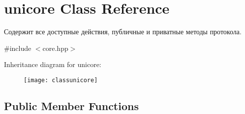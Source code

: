 \hypertarget{classunicore}{}\section{unicore Class Reference}
\label{classunicore}


Содержит все доступные действия, публичные и приватные методы протокола.  




{\ttfamily \#include $<$core.\+hpp$>$}

Inheritance diagram for unicore\+:\begin{figure}[H]
\begin{center}
\leavevmode
\texttt{[image: classunicore]}
\end{center}
\end{figure}
\subsection*{Public Member Functions}
